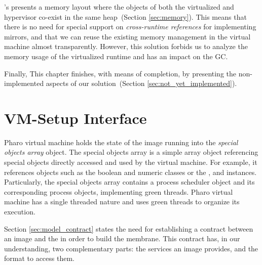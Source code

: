 \Vtt's presents a memory layout where the objects of both the virtualized and hypervisor co-exist in the same heap~(Section \ref{sec:memory}). This means that there is no need for special support on \emph{cross-runtime references} for implementing \eg mirrors, and that we can reuse the existing memory management in the virtual machine almost transparently.
However, this solution forbids us to analyze the memory usage of the virtualized runtime and has an impact on the GC.

Finally, This chapter finishes, with means of completion, by presenting the non-implemented aspects of our solution~(Section \ref{sec:not_yet_implemented}).

\section{VM-Setup Interface}\label{sec:setup_interface}

Pharo virtual machine holds the state of the image running into the \emph{special objects array} object. The special objects array is a simple array object referencing special objects directly accessed and used by the virtual machine. For example, it references objects such as the boolean and numeric classes or the ,  and  instances. Particularly, the special objects array contains a process scheduler object and its corresponding process objects, implementing green threads. Pharo virtual machine has a single threaded nature and uses green threads to organize its execution.

Section \ref{sec:model_contract} states the need for establishing a contract between an image and the \objectspace in order to build the \objectspace membrane. This contract has, in our understanding, two complementary parts: the services an image provides, and the format to access them.

